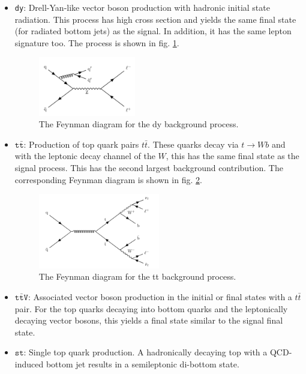 \begin{itemize}
	\item[] \texttt{dy}: Drell-Yan-like vector boson production with hadronic initial state radiation. This process has high cross section and yields the same final state (for radiated bottom jets) as the signal. In addition, it has the same lepton signature too. The process is shown in fig. \ref{fig:dy_background}.
	\begin{figure}[h!]
		\centering
		\includegraphics[width=0.4\textwidth]{figures/analysis/dy.pdf}
		\caption{The Feynman diagram for the dy background process.}
		\label{fig:dy_background}
	\end{figure}
	\item[] $\texttt{t}\bar{\texttt{t}}$: Production of top quark pairs $t\bar{t}$. These quarks decay via $t\rightarrow Wb$ and with the leptonic decay channel of the $W$, this has the same final state as the signal process. This has the second largest background contribution. The corresponding Feynman diagram is shown in fig. \ref{fig:tt_background}.
	\begin{figure}[h!]
		\centering
		\includegraphics[width=0.5\textwidth]{figures/analysis/tt.pdf}
		\caption{The Feynman diagram for the tt background process.}
		\label{fig:tt_background}
	\end{figure}
	\item[] $\texttt{t}\bar{\texttt{t}}\texttt{V}$: Associated vector boson production in the initial or final states with a $t\bar{t}$ pair. For the top quarks decaying into bottom quarks and the leptonically decaying vector bosons, this yields a final state similar to the signal final state.
	\item[] $\texttt{st}$: Single top quark production. A hadronically decaying top with a QCD-induced bottom jet results in a semileptonic di-bottom state.

\end{itemize}
